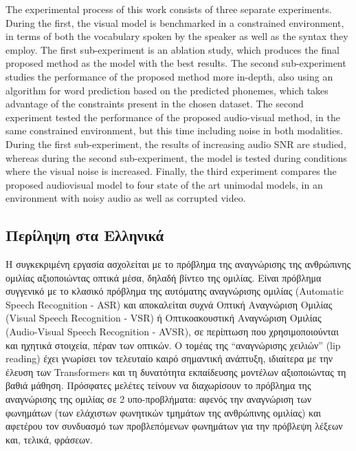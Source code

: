 The experimental process of this work consists of three separate experiments. During the first, the visual model is benchmarked in a constrained environment, in terms of both the vocabulary spoken by the speaker as well as the syntax they employ. The first sub-experiment is an ablation study, which produces the final proposed method as the model with the best results. The second sub-experiment studies the performance of the proposed method more in-depth, also using an algorithm for word prediction based on the predicted phonemes, which takes advantage of the constraints present in the chosen dataset. The second experiment tested the performance of the proposed audio-visual method, in the same constrained environment, but this time including noise in both modalities. During the first sub-experiment, the results of increasing audio SNR are studied, whereas during the second sub-experiment, the model is tested during conditions where the visual noise is increased. Finally, the third experiment compares the proposed audiovisual model to four state of the art unimodal models, in an environment with noisy audio as well as corrupted video. 

\newpage
\subsection{Περίληψη στα Ελληνικά}

Η συγκεκριμένη εργασία ασχολείται με το πρόβλημα της αναγνώρισης της ανθρώπινης ομιλίας αξιοποιώντας οπτικά μέσα, δηλαδή βίντεο της ομιλίας. Είναι πρόβλημα συγγενικό με το κλασικό πρόβλημα της αυτόματης αναγνώρισης ομιλίας (Automatic Speech Recognition - ASR) και αποκαλείται συχνά Οπτική Αναγνώριση Ομιλίας (Visual Speech Recognition - VSR) ή Οπτικοακουστική Αναγνώριση Ομιλίας (Audio-Visual Speech Recognition - AVSR), σε περίπτωση που χρησιμοποιούνται και ηχητικά στοιχεία, πέραν των οπτικών. Ο τομέας της ``αναγνώρισης χειλιών'' (lip reading) έχει γνωρίσει τον τελευταίο καιρό σημαντική ανάπτυξη, ιδιαίτερα με την έλευση των Transformers και τη δυνατότητα εκπαίδευσης μοντέλων αξιοποιώντας τη βαθιά μάθηση. Πρόσφατες μελέτες τείνουν να διαχωρίσουν το πρόβλημα της αναγνώρισης της ομιλίας σε 2 υπο-προβλήματα: αφενός την αναγνώριση των φωνημάτων (των ελάχιστων φωνητικών τμημάτων της ανθρώπινης ομιλίας) και αφετέρου τον συνδυασμό των προβλεπόμενων φωνημάτων για την πρόβλεψη λέξεων και, τελικά, φράσεων.

